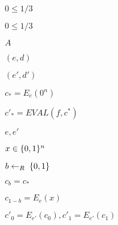 \documentclass[10pt]{book}
\begin{document}
\begin{mdSnippets}
\begin{mdInlineSnippet}[45f306c2cf0401bf58c4cd27332b1393]
$0 \leq 1/3$\end{mdInlineSnippet}%
\begin{mdInlineSnippet}[45f306c2cf0401bf58c4cd27332b1393]%
$0 \leq 1/3$\end{mdInlineSnippet}%
\begin{mdInlineSnippet}[7fc56270e7a70fa81a5935b72eacbe29]%
$A$\end{mdInlineSnippet}%
\begin{mdInlineSnippet}%
$(e,d)$\end{mdInlineSnippet}%
\begin{mdInlineSnippet}[4bb39228c515d7f90469f833862fe589]%
$(e',d')$\end{mdInlineSnippet}%
\begin{mdInlineSnippet}%
$c_* = E_e(0^n)$\end{mdInlineSnippet}%
\begin{mdInlineSnippet}[eb04f2fd398b09d27ab40612d7086219]%
$c'_*= EVAL(f,c^*)$\end{mdInlineSnippet}%
\begin{mdInlineSnippet}[1557c766ce31f140b6a176d555434f94]%
$e,e'$\end{mdInlineSnippet}%
\begin{mdInlineSnippet}%
$x\in\{0,1\}^n$\end{mdInlineSnippet}%
\begin{mdInlineSnippet}%
$b\leftarrow_R\;\{0,1\}$\end{mdInlineSnippet}%
\begin{mdInlineSnippet}[6552d099d034999fe0385e6d149a6294]%
$c_b = c_*$\end{mdInlineSnippet}%
\begin{mdInlineSnippet}%
$c_{1-b}=E_e(x)$\end{mdInlineSnippet}%
\begin{mdInlineSnippet}[f5914db211b67c0a5cb39288b6d460d0]%
$c'_0= E_{e'}(c_0),c'_1= E_{e'}(c_1)$\end{mdInlineSnippet}%
\begin{mdInlineSnippet}[98f8935a2321428b3b7cd71ff80b4dd8]%

\end{mdInlineSnippet}
\end{mdSnippets}
\end{document}
